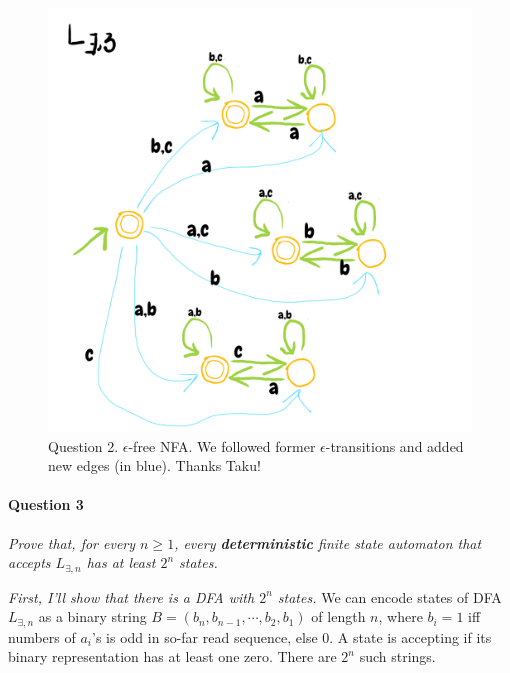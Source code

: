 \begin{figure}[!h]
    \centering
    \includegraphics[scale=0.3]{data/2018-W-2-2b.png}
    \caption{Question 2. $\epsilon$-free NFA. We followed former $\epsilon$-transitions and added new edges (in blue). Thanks Taku!}
    \label{fig:w1822b}
\end{figure}




\paragraph{Question 3}
\emph{Prove that, for every $n\geq 1$, every \textbf{deterministic} finite state automaton that accepts $L_{\exists ,n}$ has at least $2^n$ states.}

\emph{First, I'll show that there is a DFA with $2^n$ states.}
We can encode states of DFA $L_{\exists ,n}$ as a binary string $B = (b_n, b_{n-1}, \cdots, b_2, b_1)$ of length $n$, where $b_i = 1$ iff numbers of $a_i$'s is odd in so-far read sequence, else $0$.
A state is accepting if its binary representation has at least one zero.
There are $2^n$ such strings.

